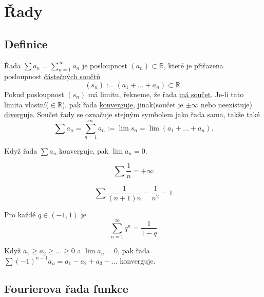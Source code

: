\documentclass[../main.tex]{subfiles}
\begin{document}
    
\section{Řady}

\subsection{Definice}

\begin{definition}
    Řada $\sum a_n = \sum_{n=1}^{\infty} a_n$
    je posloupnost $(a_n) \subset \mathbb{R}$, které je přiřazena
    posloupnost \underline{částečných součtů} \[ (s_n) := (a_1 + \dots + a_n) \subset \mathbb{R}. \]
    Pokud posloupnost $(s_n)$ má limitu, řekneme, že řada \underline{má součet}.
    Je-li tato limita vlastní($\in \mathbb{R}$), pak řada \underline{konverguje},
    jinak(součet je $\pm \infty$ nebo neexistuje) \underline{diverguje}.
    Součet řady se označuje stejným symbolem jako řada sama, takže také
    \[ \sum a_n = \sum_{n=1}^{\infty} a_n := \lim s_n = \lim (a_1 + \dots + a_n). \]
\end{definition}

\begin{lemma}
    Když řada $\sum a_n$ konverguje, pak $\lim a_n = 0$.
\end{lemma}


\begin{lemma}
    \[ \sum \frac{1}{n} = +\infty \]
\end{lemma}

\begin{lemma}
    \[ \sum \frac{1}{(n+1)n} = \frac{1}{n^2} = 1 \]
\end{lemma}

\begin{lemma}
    Pro každé $q \in (-1,1)$ je \[ \sum_{n=1}^{\infty} q^n = \frac{1}{1-q} \]
\end{lemma}

\begin{lemma}
    Když $a_1 \geq a_2 \geq \dots \geq 0$ a $\lim a_n = 0$, pak řada $\sum (-1)^{n-1}a_n = a_1 - a_2 + a_3 - \dots$ konverguje.
\end{lemma}

\subsection{Fourierova řada funkce}
\end{document}
